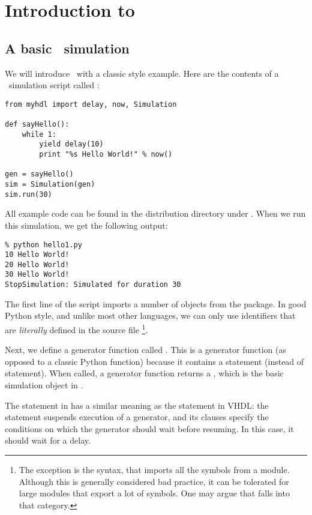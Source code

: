 \chapter{Introduction to \myhdl\ \label{intro}}

\section{A basic \myhdl\ simulation \label{intro-basic}}

We will introduce \myhdl\ with a classic  style
example. Here are the contents of a \myhdl\ simulation script called
:

\begin{verbatim}
from myhdl import delay, now, Simulation

def sayHello():
    while 1:
        yield delay(10)
        print "%s Hello World!" % now()

gen = sayHello()
sim = Simulation(gen)
sim.run(30)
\end{verbatim}

All example code can be found in the distribution directory under
.  When we run this simulation, we get the
following output:

\begin{verbatim}
% python hello1.py
10 Hello World!
20 Hello World!
30 Hello World!
StopSimulation: Simulated for duration 30
\end{verbatim}

The first line of the script imports a number of objects from the
 package. In good Python style, and unlike most other
languages, we can only use identifiers that are
\emph{literally} defined in the source file 
\footnote{The exception is the  syntax,
that imports all the symbols from a module. Although this is generally
considered bad practice, it can be tolerated for large modules that
export a lot of symbols. One may argue that
 falls into that category.}.

Next, we define a generator function called
. This is a generator function (as opposed to
a classic Python function) because it contains a 
statement (instead of  statement).
When called, a generator function returns a ,
which is the basic simulation object in \myhdl{}.

The  statement in \myhdl{} has a similar meaning as
the  statement in VHDL: the statement suspends execution
of a generator, and its clauses specify the conditions on which the
generator should wait before resuming. In this case, it should
% 
wait for a delay.

